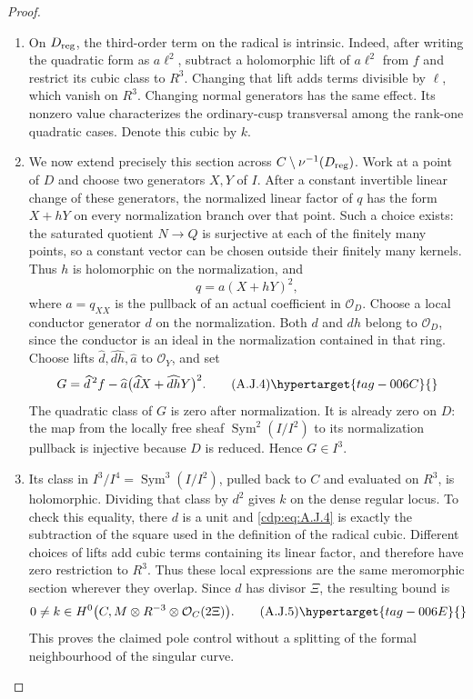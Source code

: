 \begin{proof}
\begin{enumerate}[label={$\langle1\rangle$\arabic*.},leftmargin=*]
\item On $D_{\rm reg}$, the third-order term on the radical is
intrinsic. Indeed, after writing the quadratic form as
$a\ell^2$, subtract a holomorphic lift of $a\ell^2$ from
$f$ and restrict its cubic class to $R^3$. Changing that lift
adds terms divisible by $\ell$, which vanish on $R^3$.
Changing normal generators has the same effect. Its nonzero
value characterizes the ordinary-cusp transversal among the
rank-one quadratic cases. Denote this cubic by $k$.

\item We now extend precisely this section across $C\setminus
\nu^{-1}(D_{\rm reg})$. Work at a point of $D$ and choose
two generators $X,Y$ of $I$. After a constant invertible linear
change of these generators, the normalized linear factor of
$q$ has the form $X+hY$ on every normalization branch over
that point. Such a choice exists: the saturated quotient
$N\to Q$ is surjective at each of the finitely many points,
so a constant vector can be chosen outside their finitely
many kernels. Thus $h$ is holomorphic on the normalization,
and
\[
 q=a(X+hY)^2,
\]
where $a=q_{XX}$ is the pullback of an actual coefficient
in $\mathcal O_D$. Choose a local conductor generator $d$
on the normalization. Both $d$ and $dh$ belong to
$\mathcal O_D$, since the conductor is an ideal in the
normalization contained in that ring. Choose lifts
$\widehat d,\widehat{dh},\widehat a$ to $\mathcal O_Y$,
and set
\[
 G=\widehat d^{\,2} f-
    \widehat a\bigl(\widehat d X+\widehat{dh}Y\bigr)^2.
                                                        \tag{A.J.4}\hypertarget{tag-006C}{}\label{cdp:eq:A.J.4}
\]
The quadratic class of $G$ is zero after normalization.
It is already zero on $D$: the map from the locally free
sheaf $\operatorname{Sym}^2(I/I^2)$ to its normalization
pullback is injective because $D$ is reduced. Hence
$G\in I^3$.

\item Its class in $I^3/I^4=\operatorname{Sym}^3(I/I^2)$,
pulled back to $C$ and evaluated on $R^3$, is holomorphic.
Dividing that class by $d^2$ gives $k$ on the dense regular
locus. To check this equality, there $d$ is a unit and
\eqref{cdp:eq:A.J.4} is exactly the subtraction of the square used in the
definition of the radical cubic. Different choices of lifts
add cubic terms containing its linear factor, and therefore
have zero restriction to $R^3$. Thus these local expressions
are the same meromorphic section wherever they overlap.
Since $d$ has divisor $\Xi$, the resulting bound is
\[
 0\ne k\in H^0\bigl(C,M\otimes R^{-3}
                               \otimes\mathcal O_C(2\Xi)\bigr).
                                                        \tag{A.J.5}\hypertarget{tag-006E}{}\label{cdp:eq:A.J.5}
\]
This proves the claimed pole control without a splitting of
the formal neighbourhood of the singular curve.


\end{enumerate}
\end{proof}
